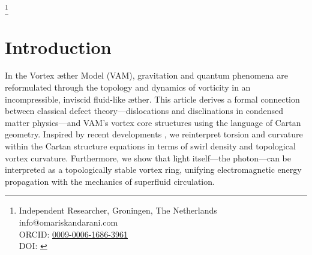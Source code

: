 \documentclass[twocolumn,aps,pre,floatfix,nofootinbib]{revtex4-2}
\begin{document}
    \title{\papertitle}
    \author{Omar Iskandarani}
    \thanks{Independent Researcher, Groningen, The Netherlands\\
    info@omariskandarani.com \\
    ORCID: \href{https://orcid.org/0009-0006-1686-3961}{0009-0006-1686-3961} \\
    DOI: \href{https://doi.org/\paperdoi}{\paperdoi}}
    \date{\today}




    \begin{abstract}
        \vspace*{-0.5em}
        \section*{\centering Abstract}
        \vspace*{-1em}
    We propose a reformulation of the photon as a quantized, massless vortex ring embedded in an incompressible, inviscid superfluid æther. Using Cartan's geometric structure equations, we draw a formal correspondence between torsional and curvature defects in condensed matter (dislocations and disclinations) and the vortex-core features of ætheric flow. The Burgers and Frank vectors of defect theory find natural analogs in swirl density and angular vorticity. We show how the photon’s Lagrangian, Hamiltonian, and Jacobian structure follow directly from vortex ring energetics in this medium. By coupling this with a Biot–Savart swirl framework and time dilation due to swirl velocity, we reproduce the null proper time of the photon from first principles. This unification provides a geometric and fluid-mechanical basis for the photon's quantized behavior and opens the door for a deeper topological reinterpretation of gauge bosons in the Standard Model.
    \end{abstract}
    \maketitle




    \section{Introduction}
        In the Vortex \ae ther Model (VAM), gravitation and quantum phenomena are reformulated through the topology and dynamics of vorticity in an incompressible, inviscid fluid-like \ae ther. This article derives a formal connection between classical defect theory---dislocations and disclinations in condensed matter physics---and VAM's vortex core structures using the language of Cartan geometry. Inspired by recent developments \cite{kobayashi2025}, we reinterpret torsion and curvature within the Cartan structure equations in terms of swirl density and topological vortex curvature. Furthermore, we show that light itself---the photon---can be interpreted as a topologically stable vortex ring, unifying electromagnetic energy propagation with the mechanics of superfluid circulation.
\end{document}
